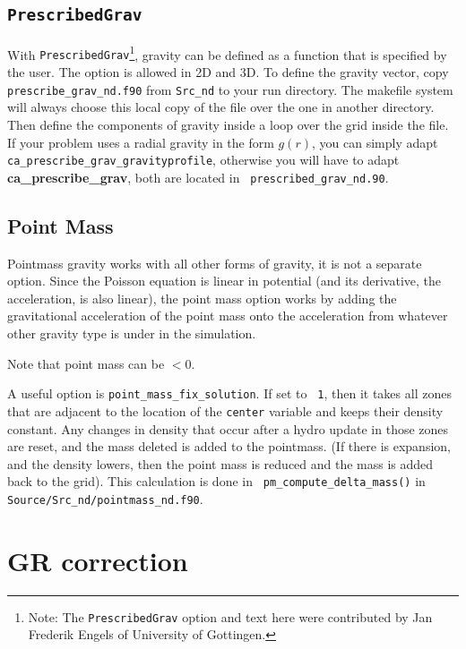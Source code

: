 \subsection{{\tt PrescribedGrav}}

With {\tt PrescribedGrav}\footnote{Note: The {\tt PrescribedGrav}
  option and text here were contributed by Jan Frederik Engels of
  University of Gottingen.}, gravity can be defined as a function that
is specified by the user.  The option is allowed in 2D and 3D.  To
define the gravity vector, copy {\tt prescribe\_grav\_nd.f90} from
{\tt Src\_nd} to your run directory.  The makefile system will always
choose this local copy of the file over the one in another directory.
Then define the components of gravity inside a loop over the grid
inside the file.  If your problem uses a radial gravity in the form
$g(r)$, you can simply adapt {\tt
  ca\_prescribe\_grav\_gravityprofile}, otherwise you will have to
adapt {\bf ca\_prescribe\_grav}, both are located in {\tt
  prescribed\_grav\_nd.90}.


\subsection{Point Mass}

Pointmass gravity works with all other forms of gravity, it is not a
separate option.  Since the Poisson equation is linear in potential
(and its derivative, the acceleration, is also linear), the point mass
option works by adding the gravitational acceleration of the point
mass onto the acceleration from whatever other gravity type is under
in the simulation.

Note that point mass can be $< 0$.

A useful option is {\tt point\_mass\_fix\_solution}.  If set to {\tt
  1}, then it takes all zones that are adjacent to the location of the
{\tt center} variable and keeps their density constant.  Any changes
in density that occur after a hydro update in those zones are reset,
and the mass deleted is added to the pointmass.  (If there is
expansion, and the density lowers, then the point mass is reduced and
the mass is added back to the grid).  This calculation is done in {\tt
  pm\_compute\_delta\_mass()} in {\tt
  Source/Src\_nd/pointmass\_nd.f90}.



\section{GR correction}


